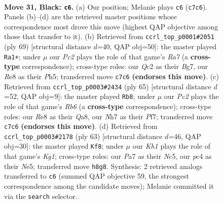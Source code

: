 \documentclass[11pt]{article}
\begin{document}
\clearpage

\begin{figure}[p]\centering
\begin{subfigure}{0.46\textwidth}\centering
\resizebox{\linewidth}{!}{%
\newchessgame
\chessboard[
  setfen={4r2k/p1pp3n/5p1Q/8/1PPP4/R7/2q2P1P/6K1 b - - 1 31},
  showmover=false,
  pgfstyle=straightmove, color=movearrow, markmove={c7-c6}
]}
\caption{}
\end{subfigure}\hfill
\begin{subfigure}{0.46\textwidth}\centering
\resizebox{\linewidth}{!}{%
\newchessgame
\chessboard[
  setfen={5k2/6b1/4Pn2/2p2Qpp/p1P5/P7/r5PP/6K1 b - - 2 35},
  showmover=false,
  pgfstyle=straightmove, color=movearrow, markmove={a2-a1}
]}
\caption{}
\end{subfigure}
\\[4pt]
\begin{subfigure}{0.46\textwidth}\centering
\resizebox{\linewidth}{!}{%
\newchessgame
\chessboard[
  setfen={q5k1/4Qpp1/7p/2p5/5P2/1r5P/6PK/3R4 b - - 1 33},
  showmover=false,
  pgfstyle=straightmove, color=movearrow, markmove={b3-b8}
]}
\caption{}
\end{subfigure}\hfill
\begin{subfigure}{0.46\textwidth}\centering
\resizebox{\linewidth}{!}{%
\newchessgame
\chessboard[
  setfen={4r1k1/8/1p1R4/2n1n1Q1/p7/6P1/P6P/1qB3K1 b - - 1 32},
  showmover=false,
  pgfstyle=straightmove, color=movearrow, markmove={g8-f8}
]}
\caption{}
\end{subfigure}
\caption{\textbf{Move 31, Black: \texttt{c6}.} (a) Our position; Melanie plays \texttt{c6} (\texttt{c7c6}). Panels (b)--(d) are the retrieved master positions whose correspondence most drove this move (highest QAP objective among those that transfer to it). (b) Retrieved from \texttt{ccrl\_top\_p0001\#2051} (ply 69) [structural distance $d$=40, QAP obj=50]: the master played \texttt{Ra1+}; under $\mu$ our \emph{Pc2} plays the role of that game's \emph{Ra7} (a \textbf{cross-type} correspondence); cross-type roles: our \emph{Q}c2 as their \emph{B}g7, our \emph{R}e8 as their \emph{P}h5; transferred move \texttt{c7c6} \textbf{(endorses this move)}. (c) Retrieved from \texttt{ccrl\_top\_p0003\#2434} (ply 65) [structural distance $d$=52, QAP obj=9]: the master played \texttt{Rb8}; under $\mu$ our \emph{Pc2} plays the role of that game's \emph{Rb6} (a \textbf{cross-type} correspondence); cross-type roles: our \emph{R}e8 as their \emph{Q}a8, our \emph{N}h7 as their \emph{P}f7; transferred move \texttt{c7c6} \textbf{(endorses this move)}. (d) Retrieved from \texttt{ccrl\_top\_p0003\#2178} (ply 63) [structural distance $d$=46, QAP obj=30]: the master played \texttt{Kf8}; under $\mu$ our \emph{Kh1} plays the role of that game's \emph{Kg1}; cross-type roles: our \emph{P}a7 as their \emph{N}c5, our \emph{p}c4 as their \emph{N}e5; transferred move \texttt{h8g8}. Synthesis: 2 retrieved analogs transferred to \texttt{c6} (summed QAP objective 59, the strongest correspondence among the candidate moves); Melanie committed it via the \texttt{search} selector.}
\label{fig:thought-m61}
\end{figure}
\end{document}
